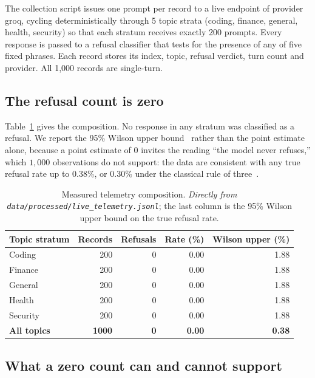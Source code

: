 \documentclass[journal]{IEEEtran}
\theoremstyle{definition}
\newcommand{\Nrec}{1{,}000}
\newcommand{\Ntopics}{5}
\newcommand{\Nper}{200}
\newcommand{\WilsonUp}{0.38}
\newcommand{\RuleThree}{0.30}
\newcommand{\Provider}{groq}
\begin{document}
The collection script issues one prompt per record to a live endpoint of provider
\Provider{}, cycling deterministically through \Ntopics{} topic strata
(coding, finance, general, health, security) so that each stratum receives
exactly \Nper{} prompts. Every response is passed to a refusal classifier that
tests for the presence of any of five fixed phrases. Each record stores its
index, topic, refusal verdict, turn count and provider. All \Nrec{} records are
single-turn.

\subsection{The refusal count is zero}

Table~\ref{tab:telemetry} gives the composition. No response in any stratum was
classified as a refusal. We report the 95\% Wilson upper
bound~\cite{wilson1927interval} rather than the point estimate alone, because a
point estimate of $0$ invites the reading ``the model never refuses,'' which
$\Nrec{}$ observations do not support: the data are consistent with any true
refusal rate up to \WilsonUp\%, or \RuleThree\% under the classical rule of
three~\cite{hanley1983zero}.

\begin{table}[t]
\centering
\caption{Measured telemetry composition. \emph{Directly from
\texttt{data/\allowbreak{}processed/\allowbreak{}live\_\allowbreak{}telemetry.\allowbreak{}jsonl}}; the last column is the 95\%
Wilson upper bound on the true refusal rate.}
\label{tab:telemetry}
\small
\setlength{\tabcolsep}{4pt}
\begin{tabular}{lrrrr}
\toprule
Topic stratum & Records & Refusals & Rate (\%) & Wilson upper (\%) \\
\midrule
Coding & 200 & 0 & 0.00 & 1.88 \\
Finance & 200 & 0 & 0.00 & 1.88 \\
General & 200 & 0 & 0.00 & 1.88 \\
Health & 200 & 0 & 0.00 & 1.88 \\
Security & 200 & 0 & 0.00 & 1.88 \\
\addlinespace
\textbf{All topics} & \textbf{1000} & \textbf{0} & \textbf{0.00} & \textbf{0.38} \\
\bottomrule
\end{tabular}
\end{table}

\subsection{What a zero count can and cannot support}
\label{sec:resolution}
\end{document}
